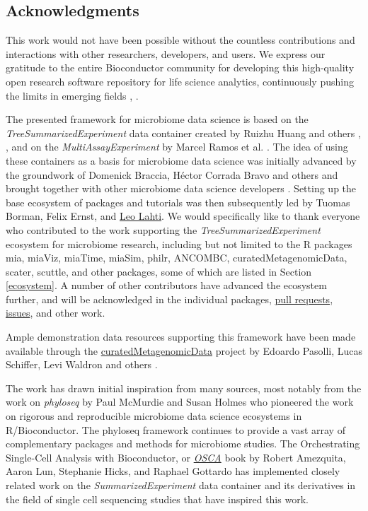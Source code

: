 \documentclass[
]{book}
\begin{document}
\hypertarget{acknowledgments}{%
\subsection*{Acknowledgments}\label{acknowledgments}}

This work would not have been possible without the countless
contributions and interactions with other researchers, developers, and
users. We express our gratitude to the entire Bioconductor community
for developing this high-quality open research software repository for
life science analytics, continuously pushing the limits in emerging
fields \citep{Gentleman2004}, \citep{Huber2015}.

The presented framework for microbiome data science is based on the
\emph{TreeSummarizedExperiment} data container created by Ruizhu Huang and
others \citep{R_TreeSummarizedExperiment}, \citep{Ernst2020}, and on the
\emph{MultiAssayExperiment} by Marcel Ramos et al. \citep{Ramos2017}. The idea
of using these containers as a basis for microbiome data science was
initially advanced by the groundwork of Domenick Braccia, Héctor
Corrada Bravo and others and brought together with other microbiome
data science developers \citep{Shetty2019}. Setting up the base ecosystem
of packages and tutorials was then subsequently led by Tuomas Borman,
Felix Ernst, and \href{http://www.iki.fi/Leo.Lahti}{Leo Lahti}. We would
specifically like to thank everyone who contributed to the work
supporting the \emph{TreeSummarizedExperiment} ecosystem for microbiome
research, including but not limited to the R packages mia, miaViz,
miaTime, miaSim, philr, ANCOMBC, curatedMetagenomicData, scater,
scuttle, and other packages, some of which are listed in Section
\ref{ecosystem}. A number of other contributors have advanced the
ecosystem further, and will be acknowledged in the individual
packages, \href{https://github.com/microbiome/OMA/graphs/contributors}{pull
requests},
\href{https://github.com/microbiome/OMA/issues}{issues}, and other work.

Ample demonstration data resources supporting this framework have been
made available through the
\href{https://waldronlab.io/curatedMetagenomicData/}{curatedMetagenomicData}
project by Edoardo Pasolli, Lucas Schiffer, Levi Waldron and others
\citep{Pasolli2017}.

The work has drawn initial inspiration from many sources, most notably
from the work on \emph{phyloseq} by Paul McMurdie and Susan Holmes
\citep{McMurdie2013} who pioneered the work on rigorous and reproducible
microbiome data science ecosystems in R/Bioconductor. The phyloseq
framework continues to provide a vast array of complementary packages
and methods for microbiome studies. The Orchestrating Single-Cell
Analysis with Bioconductor, or
\href{https://bioconductor.org/books/release/OSCA/}{\emph{OSCA}} book by Robert
Amezquita, Aaron Lun, Stephanie Hicks, and Raphael Gottardo
\citep{Amezquita2020natmeth} has implemented closely related work on the
\emph{SummarizedExperiment} data container and its derivatives in the field
of single cell sequencing studies that have inspired this work.
\end{document}
